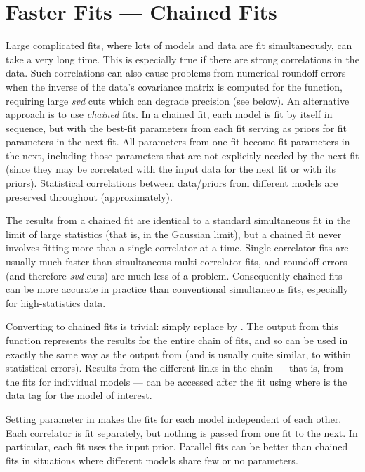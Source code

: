\documentclass[letterpaper,10pt,english]{sphinxmanual}
\begin{document}
\section{Faster Fits --- Chained Fits}
\label{corrfitter:chained-fits}\label{corrfitter:faster-fits-chained-fits}
Large complicated fits, where lots of models and data are fit simultaneously,
can  take a very long time. This is especially true if there are strong
correlations in the data. Such correlations can also cause  problems from
numerical roundoff errors when the inverse of the data's covariance matrix is
computed for the  function, requiring large \emph{svd} cuts which can
degrade precision (see below). An alternative approach is to use \emph{chained}
fits.  In a chained fit, each model is fit by itself in sequence, but with the
best-fit parameters from each fit serving as priors for fit parameters in  the
next fit. All parameters from one fit become fit parameters in the next,
including those parameters that are  not explicitly needed by the next fit
(since they may be correlated with the input data for the next fit or with its
priors). Statistical  correlations between data/priors from different models
are preserved  throughout (approximately).

The results from a chained fit are identical to a standard simultaneous fit in
the limit of large statistics (that is, in the Gaussian limit), but a  chained
fit never involves fitting more than a single correlator at a time.
Single-correlator fits are usually much faster than simultaneous multi-correlator
fits, and roundoff errors (and therefore \emph{svd} cuts) are much less of a
problem. Consequently chained fits can be more accurate in practice than
conventional simultaneous fits, especially for high-statistics data.

Converting to chained fits is trivial: simply replace 
by . The output from this function represents
the results for the entire chain of fits, and so can be used in exactly the
same way as the  output from  (and is usually quite
similar, to within statistical errors). Results from the different links in
the chain --- that is, from the fits for individual models --- can be accessed
after the fit using  where  is the
data tag for the model of interest.

Setting parameter  in  makes the
fits for each model independent of each other. Each correlator is
fit separately, but nothing is passed from one fit to the next. In particular,
each fit uses the input prior. Parallel fits can be better than chained
fits in situations where different models share few or no parameters.
\end{document}
